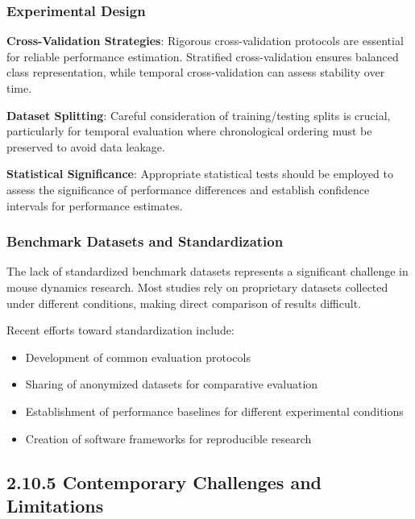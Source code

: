 \documentclass[
  12pt,
  a4paper,
]{report}
\providecommand{\tightlist}{%
  \setlength{\itemsep}{0pt}\setlength{\parskip}{0pt}}
\begin{document}
\subsubsection{Experimental Design}\label{experimental-design}

\textbf{Cross-Validation Strategies}: Rigorous cross-validation
protocols are essential for reliable performance estimation. Stratified
cross-validation ensures balanced class representation, while temporal
cross-validation can assess stability over time.

\textbf{Dataset Splitting}: Careful consideration of training/testing
splits is crucial, particularly for temporal evaluation where
chronological ordering must be preserved to avoid data leakage.

\textbf{Statistical Significance}: Appropriate statistical tests should
be employed to assess the significance of performance differences and
establish confidence intervals for performance estimates.

\subsubsection{Benchmark Datasets and
Standardization}\label{benchmark-datasets-and-standardization}

The lack of standardized benchmark datasets represents a significant
challenge in mouse dynamics research. Most studies rely on proprietary
datasets collected under different conditions, making direct comparison
of results difficult.

Recent efforts toward standardization include:

\begin{itemize}
\tightlist
\item
  Development of common evaluation protocols
\item
  Sharing of anonymized datasets for comparative evaluation
\item
  Establishment of performance baselines for different experimental
  conditions
\item
  Creation of software frameworks for reproducible research
\end{itemize}

\subsection{2.10.5 Contemporary Challenges and
Limitations}\label{contemporary-challenges-and-limitations}
\end{document}
